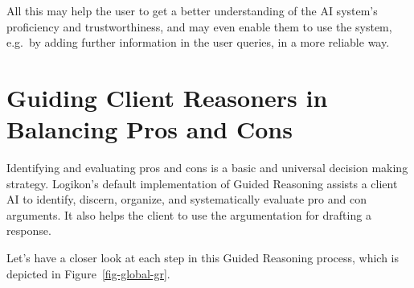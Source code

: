 \documentclass[
  letterpaper,
  DIV=11,
  numbers=noendperiod]{scrartcl}
\begin{document}
All this may help the user to get a better understanding of the AI
system's proficiency and trustworthiness, and may even enable them to
use the system, e.g.~by adding further information in the user queries,
in a more reliable way.

\hypertarget{guiding-client-reasoners-in-balancing-pros-and-cons}{%
\section{Guiding Client Reasoners in Balancing Pros and
Cons}\label{guiding-client-reasoners-in-balancing-pros-and-cons}}

Identifying and evaluating pros and cons is a basic and universal
decision making strategy. Logikon's default implementation of Guided
Reasoning assists a client AI to identify, discern, organize, and
systematically evaluate pro and con arguments. It also helps the client
to use the argumentation for drafting a response.

Let's have a closer look at each step in this Guided Reasoning process,
which is depicted in Figure~\ref{fig-global-gr}.
\end{document}
